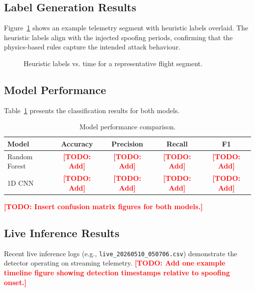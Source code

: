 \documentclass[11pt,a4paper]{article}
\newcommand{\todo}[1]{\textcolor{red}{\textbf{[TODO: #1]}}}
\begin{document}
\subsection{Label Generation Results}

Figure~\ref{fig:labels} shows an example telemetry segment with heuristic labels overlaid. The heuristic labels align with the injected spoofing periods, confirming that the physics-based rules capture the intended attack behaviour.

\begin{figure}[H]
\centering
{}
\caption{Heuristic labels vs. time for a representative flight segment.}
\label{fig:labels}
\end{figure}

\subsection{Model Performance}

Table~\ref{tab:model_perf} presents the classification results for both models.

\begin{table}[H]
\centering
\caption{Model performance comparison.}
\label{tab:model_perf}
\begin{tabular}{@{}lcccc@{}}
\toprule
\textbf{Model} & \textbf{Accuracy} & \textbf{Precision} & \textbf{Recall} & \textbf{F1} \\
\midrule
Random Forest & \todo{Add} & \todo{Add} & \todo{Add} & \todo{Add} \\
1D CNN & \todo{Add} & \todo{Add} & \todo{Add} & \todo{Add} \\
\bottomrule
\end{tabular}
\end{table}

\todo{Insert confusion matrix figures for both models.}

\subsection{Live Inference Results}

Recent live inference logs (e.g., \texttt{live\_20260510\_050706.csv}) demonstrate the detector operating on streaming telemetry. \todo{Add one example timeline figure showing detection timestamps relative to spoofing onset.}
\end{document}

